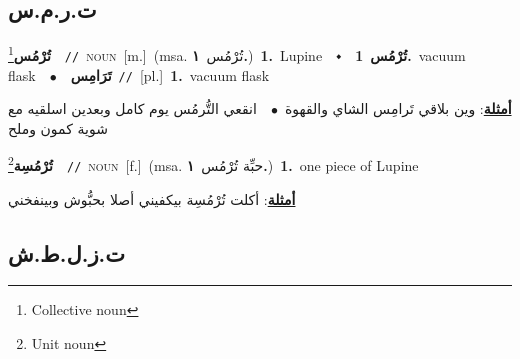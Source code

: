 \documentclass[10pt,a4paper,twoside]{article} %
\begin{document}
\begin{multicols}{2}
{{{{{{{{{{\vspace{-3mm}
\subsection*{\color{blue}\foreignlanguage{arabic}{ت.ر.م.س}\color{blue}{ (ntws)}} 

{\setlength\topsep{0pt}\textbf{\foreignlanguage{arabic}{تُرْمُس}}\footnote{Collective noun}\ \ {\color{gray}\texttt{//}\color{black}}\ \textsc{noun}\ [m.]\ \color{gray}(msa. \foreignlanguage{arabic}{تُرْمُس}~\foreignlanguage{arabic}{\textbf{١.}})\color{black}\ \textbf{1.}~Lupine\ \ $\smblkdiamond$\ \ \setlength\topsep{0pt}\textbf{\foreignlanguage{arabic}{تُرْمُس}}\ \textbf{1.}~vacuum flask\ \ $\bullet$\ \ \setlength\topsep{0pt}\textbf{\foreignlanguage{arabic}{تَرَامِس}}\ {\color{gray}\texttt{//}\color{black}}\ [pl.]\ \textbf{1.}~vacuum flask\  \begin{flushright}\color{gray}\foreignlanguage{arabic}{\textbf{\underline{\foreignlanguage{arabic}{أمثلة}}}: وين بلاقي تَرامِس الشاي والقهوة\ $\bullet$\ \  انقعي التُّرمُس يوم كامل وبعدين اسلقيه مع شوية كمون وملح}\end{flushright}\color{black}} \vspace{2mm}

{\setlength\topsep{0pt}\textbf{\foreignlanguage{arabic}{تُرْمُسِة}}\footnote{Unit noun}\ \ {\color{gray}\texttt{//}\color{black}}\ \textsc{noun}\ [f.]\ \color{gray}(msa. \foreignlanguage{arabic}{حبِّة تُرْمُس}~\foreignlanguage{arabic}{\textbf{١.}})\color{black}\ \textbf{1.}~one piece of Lupine\  \begin{flushright}\color{gray}\foreignlanguage{arabic}{\textbf{\underline{\foreignlanguage{arabic}{أمثلة}}}: أكلت تُرْمُسِة بيكفيني أصلا بحبُّوش وبينفخني}\end{flushright}\color{black}} \vspace{2mm}

\vspace{-3mm}
\subsection*{\color{blue}\foreignlanguage{arabic}{ت.ز.ل.ط.ش}\color{blue}{ (ntws)}} 

}}}}}}}}}}
\end{multicols}
\end{document}
